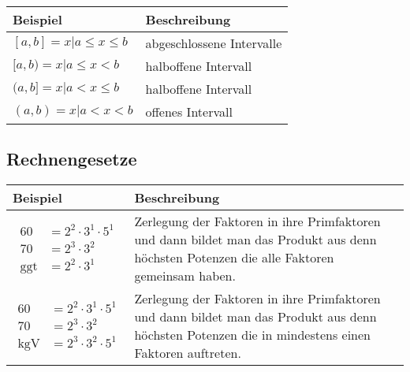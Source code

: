 \begin{tabularx}{\textwidth}{p{4cm}X}
\toprule
 Beispiel & Beschreibung \\
\midrule
\noindent
$[a,b]={x|a\leq x\leq b}$ & abgeschlossene Intervalle \\
$[a,b)={x|a\leq x < b}$ & halboffene Intervall\\
$(a,b]={x|a< x \leq b}$ & halboffene Intervall\\
$(a,b)={x|a<x<b}$ & offenes Intervall\\
\bottomrule
\end{tabularx}

\subsection{Rechnengesetze}

\begin{tabularx}{\textwidth}{p{3cm}X}
\toprule
 Beispiel & Beschreibung \\
\midrule
{\begin{align*}60 & =2^2\cdot3^1\cdot5^1 \\ 70 & =2^3\cdot3^2\\\text{ggt} & = 2^2\cdot3^1\end{align*}} & Zerlegung der Faktoren in ihre Primfaktoren und dann bildet man das Produkt aus denn höchsten Potenzen die alle Faktoren gemeinsam haben. \\
{\begin{align*}60 & =2^2\cdot3^1\cdot5^1 \\ 70 & =2^3\cdot3^2\\\text{kgV} & = 2^3\cdot3^2\cdot5^1\end{align*}}  &
Zerlegung der Faktoren in ihre Primfaktoren und dann bildet man das Produkt aus denn höchsten Potenzen die in mindestens einen Faktoren auftreten. \\
\bottomrule
\end{tabularx}

